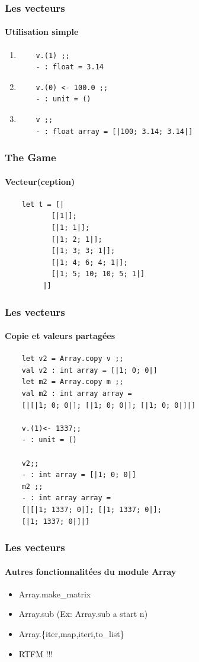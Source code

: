 \begin{frame}[fragile]
	\frametitle{Les vecteurs}
	\framesubtitle{Utilisation simple}
	\begin{enumerate}
	\item
	\begin{lstlisting}
	v.(1) ;;
	- : float = 3.14
	\end{lstlisting}

	\item
	\begin{lstlisting}
	v.(0) <- 100.0 ;;
	- : unit = ()
	\end{lstlisting}

	\item
	\begin{lstlisting}
	v ;;
	- : float array = [|100; 3.14; 3.14|]
	\end{lstlisting}
	\end{enumerate}
\end{frame}

\begin{frame}[fragile]
	\frametitle{The Game}
	\framesubtitle{Vecteur(ception)}
	\begin{lstlisting}
	let t = [| 
           [|1|];
           [|1; 1|];
           [|1; 2; 1|];
           [|1; 3; 3; 1|];
           [|1; 4; 6; 4; 1|];
           [|1; 5; 10; 10; 5; 1|]
         |] 
	\end{lstlisting}
\end{frame}

\begin{frame}[fragile]
	\frametitle{Les vecteurs}
	\framesubtitle{Copie et valeurs partagées}
	\begin{lstlisting}
	let v2 = Array.copy v ;;
	val v2 : int array = [|1; 0; 0|]
	let m2 = Array.copy m ;;
	val m2 : int array array = 
	[|[|1; 0; 0|]; [|1; 0; 0|]; [|1; 0; 0|]|]

	v.(1)<- 1337;;
	- : unit = ()

	v2;; 
	- : int array = [|1; 0; 0|]
	m2 ;;
	- : int array array = 
	[|[|1; 1337; 0|]; [|1; 1337; 0|]; 
	[|1; 1337; 0|]|]
	\end{lstlisting}
\end{frame}

\begin{frame}[fragile]
	\frametitle{Les vecteurs}
	\framesubtitle{Autres fonctionnalitées du module Array}
	\begin{itemize}
	\item Array.make\_matrix
	
	\item Array.sub (Ex: Array.sub a start n)
	
	\item Array.\{iter,map,iteri,to\_list\}

	\item RTFM !!!
	\end{itemize}
\end{frame}


